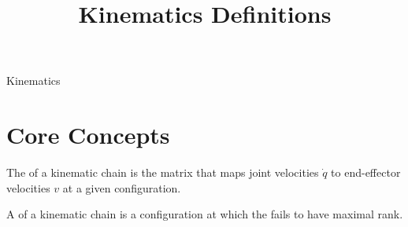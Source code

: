 \documentclass[hidelinks]{article}
\title{Kinematics Definitions}
\author{}
\date{}
\begin{document}
\maketitle

\begin{smodule}[title={Kinematics}]{Kinematics}

    \section{Core Concepts}

    \begin{sdefinition}[for=Jacobian]
        The  of a kinematic chain is the matrix that maps joint velocities $\dot q$ to end-effector velocities $v$ at a given configuration.
    \end{sdefinition}

    \begin{sdefinition}[for=singularity]
        A  of a kinematic chain is a configuration at which the  fails to have maximal rank.
    \end{sdefinition}

\end{smodule}
\end{document}
